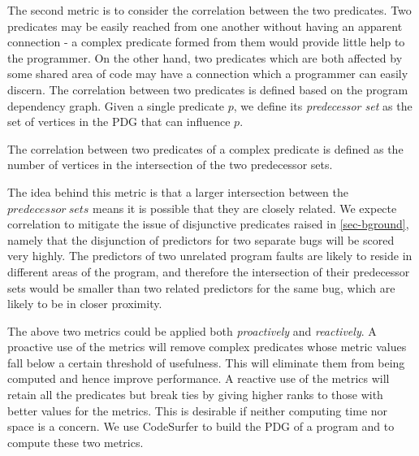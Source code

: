 The second metric is to consider the correlation between the two predicates.  Two predicates may be easily reached from one another without having an apparent connection - a complex predicate formed from them would provide little help to the programmer.  On the other hand, two predicates which are both affected by some shared area of code may have a connection which a programmer can easily discern.  The correlation between two predicates is defined based on the program dependency graph.  Given a single predicate $p$, we define its \textit{predecessor set} as the set of vertices in the PDG that can influence $p$.

\begin{defn}
\label{dfn5}
The correlation between two predicates of a complex predicate is defined as the number of vertices in the intersection of the two predecessor sets.
\end{defn}

The idea behind this metric is that a larger intersection between the $predecessor\ sets$ means it is possible that they are closely related.  We expecte correlation to mitigate the issue of disjunctive predicates raised in \autoref{sec-bground}, namely that the disjunction of predictors for two separate bugs will be scored very highly.  The predictors of two unrelated program faults are likely to reside in different areas of the program, and therefore the intersection of their predecessor sets would be smaller than two related predictors for the same bug, which are likely to be in closer proximity.

The above two metrics could be applied both \emph{proactively} and \emph{reactively}.  A proactive use of the metrics will remove complex predicates whose metric values fall below a certain threshold of usefulness.  This will eliminate them from being computed and hence improve performance.  A reactive use of the metrics will retain all the predicates but break ties by giving higher ranks to those with better values for the metrics. This is desirable if neither computing time nor space is a concern.  We use CodeSurfer to build the PDG of a program and to compute these two metrics.

